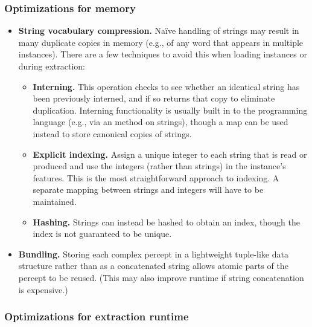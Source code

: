 \documentclass[11pt,letterpaper]{article}
\begin{document}
\subsubsection{Optimizations for memory}

\begin{itemize}
\item \textbf{String vocabulary compression.}
Na\"{i}ve handling of strings may result in many duplicate copies in memory 
(e.g., of any word that appears in multiple instances). 
There are a few techniques to avoid this when loading instances or during extraction:
\begin{itemize}
\item \textbf{Interning.} This operation checks to see whether an identical string has been previously interned, 
and if so returns that copy to eliminate duplication.
Interning functionality is usually built in to the programming language (e.g., via an  method on strings), 
though a map can be used instead to store canonical copies of strings.
\item \textbf{Explicit indexing.} 
Assign a unique integer to each string that is read or produced 
and use the integers (rather than strings) in the instance's features. 
This is the most straightforward approach to indexing.
A separate mapping between strings and integers will have to be maintained. 
\item \textbf{Hashing.} Strings can instead be hashed to obtain an index, 
though the index is not guaranteed to be unique.
\end{itemize}

\item \textbf{Bundling.} 
Storing each complex percept in a lightweight tuple-like data structure rather than as a concatenated string 
allows atomic parts of the percept to be reused. 
(This may also improve runtime if string concatenation is expensive.)
\end{itemize}

\subsubsection{Optimizations for extraction runtime}
\end{document}
